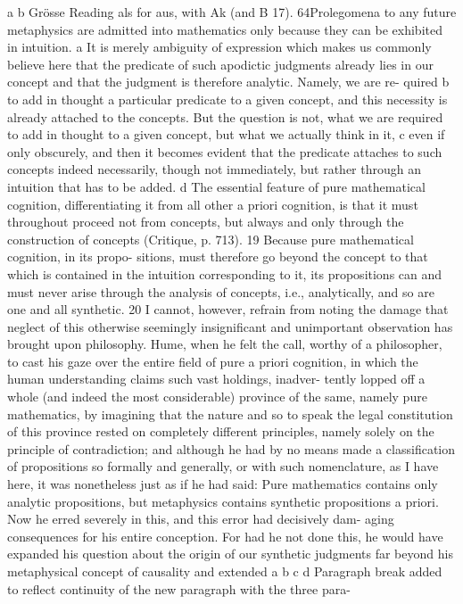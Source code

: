 a
b
Grösse
Reading als for aus, with Ak (and B 17).
64Prolegomena to any future metaphysics
are admitted into mathematics only because they can be exhibited in
intuition. a
It is merely ambiguity of expression which makes us commonly believe
here that the predicate of such apodictic judgments already lies in our
concept and that the judgment is therefore analytic. Namely, we are re-
quired b to add in thought a particular predicate to a given concept, and
this necessity is already attached to the concepts. But the question is not,
what we are required to add in thought to a given concept, but what we
actually think in it, c even if only obscurely, and then it becomes evident
that the predicate attaches to such concepts indeed necessarily, though
not immediately, but rather through an intuition that has to be added. d
The essential feature of pure mathematical cognition, differentiating
it from all other a priori cognition, is that it must throughout proceed not
from concepts, but always and only through the construction of concepts
(Critique, p. 713). 19 Because pure mathematical cognition, in its propo-
sitions, must therefore go beyond the concept to that which is contained
in the intuition corresponding to it, its propositions can and must never
arise through the analysis of concepts, i.e., analytically, and so are one
and all synthetic. 20
I cannot, however, refrain from noting the damage that neglect of
this otherwise seemingly insigniﬁcant and unimportant observation has
brought upon philosophy. Hume, when he felt the call, worthy of a
philosopher, to cast his gaze over the entire ﬁeld of pure a priori cognition,
in which the human understanding claims such vast holdings, inadver-
tently lopped off a whole (and indeed the most considerable) province
of the same, namely pure mathematics, by imagining that the nature and
so to speak the legal constitution of this province rested on completely
different principles, namely solely on the principle of contradiction; and
although he had by no means made a classiﬁcation of propositions so
formally and generally, or with such nomenclature, as I have here, it
was nonetheless just as if he had said: Pure mathematics contains only
analytic propositions, but metaphysics contains synthetic propositions a
priori. Now he erred severely in this, and this error had decisively dam-
aging consequences for his entire conception. For had he not done this,
he would have expanded his question about the origin of our synthetic
judgments far beyond his metaphysical concept of causality and extended
a
b
c
d
Paragraph break added to reﬂect continuity of the new paragraph with the three para-
